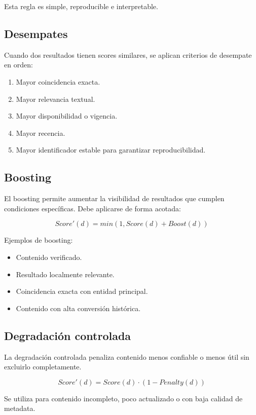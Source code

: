 \documentclass[12pt,a4paper]{article}
\begin{document}
Esta regla es simple, reproducible e interpretable.

\subsection{Desempates}

Cuando dos resultados tienen scores similares, se aplican criterios de desempate en orden:

\begin{enumerate}[noitemsep]
    \item Mayor coincidencia exacta.
    \item Mayor relevancia textual.
    \item Mayor disponibilidad o vigencia.
    \item Mayor recencia.
    \item Mayor identificador estable para garantizar reproducibilidad.
\end{enumerate}

\subsection{Boosting}

El boosting permite aumentar la visibilidad de resultados que cumplen condiciones específicas. Debe aplicarse de forma acotada:

\[
Score'(d) = min(1, Score(d) + Boost(d))
\]

Ejemplos de boosting:

\begin{itemize}[noitemsep]
    \item Contenido verificado.
    \item Resultado localmente relevante.
    \item Coincidencia exacta con entidad principal.
    \item Contenido con alta conversión histórica.
\end{itemize}

\subsection{Degradación controlada}

La degradación controlada penaliza contenido menos confiable o menos útil sin excluirlo completamente.

\[
Score'(d) = Score(d) \cdot (1 - Penalty(d))
\]

Se utiliza para contenido incompleto, poco actualizado o con baja calidad de metadata.
\end{document}
